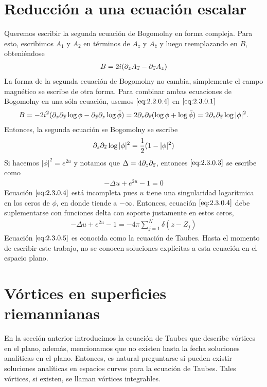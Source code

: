 \section{Reducción a una ecuación escalar}
\label{sec: 2.3}

Queremos escribir la segunda ecuación de Bogomolny en forma compleja. Para esto, escribimos $A_1$ y $A_2$ en términos de $A_z$ y $A_{\overline z}$ y luego reemplazando en $B$, obteniéndose
\begin{align}
    B = 2i(\partial_z A_{\overline z}-\partial_{\overline z} A_z)\label{eq:2.3.0.1}
\end{align}
La forma de la segunda ecuación de Bogomolny no cambia, simplemente el campo magnético se escribe de otra forma. Para combinar ambas ecuaciones de Bogomolny en una sóla ecuación, usemos $\eqref{eq:2.2.0.4}$ en $\eqref{eq:2.3.0.1}$
\begin{align}
    B = -2i^2(\partial_z \partial_{\overline z}\log\phi-\partial_{\overline z}\partial_z\log\bar\phi) = 2\partial_z\partial_{\overline z}(\log\phi+\log\bar\phi) = 2\partial_z\partial_{\overline z}\log|\phi|^2. \label{eq:2.3.0.2}
\end{align}
Entonces, la segunda ecuación se Bogomolny se escribe
\begin{align}
    \partial_z\partial_{\overline z}\log|\phi|^2 = \frac{1}{2}(1-|\phi|^2) \label{eq:2.3.0.3}
\end{align}
Si hacemos $|\phi|^2 = e^{2u}$ y notamos que $\Delta=4\partial_z\partial_{\overline z}$, entonces $\eqref{eq:2.3.0.3}$ se escribe como
\begin{align}
    -\Delta u+e^{2u}-1 =0 \label{eq:2.3.0.4}
\end{align}
Ecuación $\eqref{eq:2.3.0.4}$ está incompleta pues $u$ tiene una singularidad logarítmica en los ceros de $\phi$, en donde tiende a $-\infty$. Entonces, ecuación $\eqref{eq:2.3.0.4}$ debe suplementarse con funciones delta con soporte justamente en estos ceros,
\begin{align}
    -\Delta u+e^{2u}-1 =-4\pi\sum_{j=1}^N\delta(z-Z_j)\label{eq:2.3.0.5}
\end{align}
Ecuación $\eqref{eq:2.3.0.5}$ es conocida como la ecuación de Taubes. Hasta el momento de escribir este trabajo, no se conocen soluciones explícitas a esta ecuación en el espacio plano.

\section{Vórtices en superficies riemannianas}

En la sección anterior introducimos la ecuación de Taubes que describe vórtices en el plano, además, mencionamos que no existen hasta la fecha soluciones analíticas en el plano. Entonces, es natural preguntarse si pueden existir soluciones analíticas en espacios curvos para la ecuación de Taubes. Tales vórtices, si existen, se llaman vórtices integrables.

